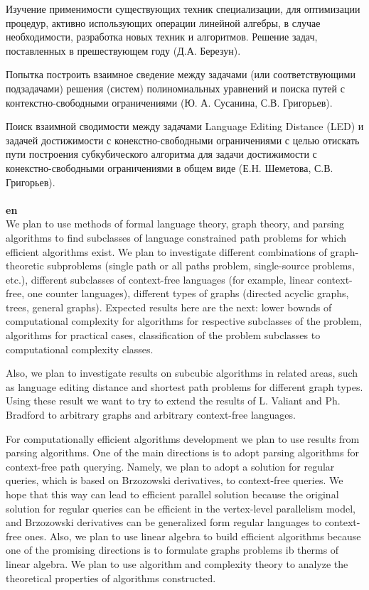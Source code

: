 \documentclass[12pt]{article}  %
\theoremstyle{remark}
\begin{document}
Изучение применимости существующих техник специализации, для оптимизации процедур, активно использующих операции линейной алгебры, в случае необходимости, разработка новых техник и алгоритмов. Решение задач, поставленных в прешествующем году (Д.А. Березун).

Попытка построить взаимное сведение между задачами (или соответствующими подзадачами) решения (систем) полиномиальных уравнений и поиска путей с контекстно-свободными ограничениями (Ю. А. Сусанина, С.В. Григорьев).

Поиск взаимной сводимости между задачами Language Editing Distance (LED) и задачей достижимости с конекстно-свободными ограничениями с целью отискать пути построения субкубического алгоритма для задачи достижимости с конекстно-свободными ограничениями в общем виде (Е.Н. Шеметова, С.В. Григорьев).
\\
\\
\textbf{en}\\
We plan to use methods of formal language theory, graph theory, and parsing algorithms to find subclasses of language constrained path problems for which efficient algorithms exist.
We plan to investigate different combinations of graph-theoretic subproblems (single path or all paths problem, single-source problems, etc.), different subclasses of context-free languages (for example, linear context-free, one counter languages), different types of graphs (directed acyclic graphs, trees, general graphs).
Expected results here are the next: lower bownds of computational complexity for algorithms for respective subclasses of the problem, algorithms for practical cases, classification of the problem subclasses to computational complexity classes.

Also, we plan to investigate results on subcubic algorithms in related areas, such as language editing distance and shortest path problems for different graph types. Using these result we want to try to extend the results of L. Valiant and Ph. Bradford to arbitrary graphs and arbitrary context-free languages.

For computationally efficient algorithms development we plan to use results from parsing algorithms.
One of the main directions is to adopt parsing algorithms for context-free path querying.
Namely, we plan to adopt a solution for regular queries, which is based on Brzozowski derivatives, to context-free queries.
We hope that this way can lead to efficient parallel solution because the original solution for regular queries can be efficient in the vertex-level parallelism model, and Brzozowski derivatives can be generalized form regular languages to context-free ones.
Also, we plan to use linear algebra to build efficient algorithms because one of the promising directions is to formulate graphs problems ib therms of linear algebra.
We plan to use algorithm and complexity theory to analyze the theoretical properties of algorithms constructed.
\end{document}
